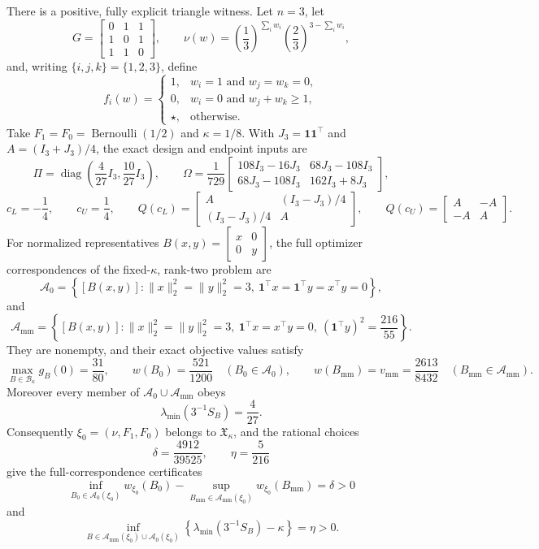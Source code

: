 There is a positive, fully explicit triangle witness.  Let \(n=3\), let
\[
G=\begin{bmatrix}0&1&1\\1&0&1\\1&1&0\end{bmatrix},
\qquad
\nu(w)=\left(\frac13\right)^{\sum_iw_i}
       \left(\frac23\right)^{3-\sum_iw_i},
\]
and, writing \(\{i,j,k\}=\{1,2,3\}\), define
\[
f_i(w)=
\begin{cases}
1,&w_i=1\text{ and }w_j=w_k=0,\\
0,&w_i=0\text{ and }w_j+w_k\ge1,\\
\star,&\text{otherwise}.
\end{cases}
\]
Take \(F_1=F_0=\operatorname{Bernoulli}(1/2)\) and \(\kappa=1/8\).  With \(J_3=\mathbf 1\mathbf 1^{\top}\) and \(A=(I_3+J_3)/4\), the exact design and endpoint inputs are
\[
\Pi=\operatorname{diag}\!\left(\frac4{27}I_3,\frac{10}{27}I_3\right),
\qquad
\Omega=\frac1{729}
\begin{bmatrix}
108I_3-16J_3&68J_3-108I_3\\
68J_3-108I_3&162I_3+8J_3
\end{bmatrix},
\]
\[
c_L=-\frac14,
\qquad c_U=\frac14,
\qquad
Q(c_L)=
\begin{bmatrix}A&(I_3-J_3)/4\\(I_3-J_3)/4&A\end{bmatrix},
\qquad
Q(c_U)=
\begin{bmatrix}A&-A\\-A&A\end{bmatrix}.
\]
For normalized representatives \(B(x,y)=\begin{bmatrix}x&0\\0&y\end{bmatrix}\), the full optimizer correspondences of the fixed-\(\kappa\), rank-two problem are
\[
\mathcal A_0=
\left\{[B(x,y)]:
\lVert x\rVert_2^2=\lVert y\rVert_2^2=3,\ 
\mathbf 1^{\top}x=\mathbf 1^{\top}y=x^{\top}y=0
\right\},
\]
and
\[
\mathcal A_{\mathrm{mm}}=
\left\{[B(x,y)]:
\lVert x\rVert_2^2=\lVert y\rVert_2^2=3,\ 
\mathbf 1^{\top}x=x^{\top}y=0,\ 
(\mathbf 1^{\top}y)^2=\frac{216}{55}
\right\}.
\]
They are nonempty, and their exact objective values satisfy
\[
\max_{B\in\mathcal B_\kappa}g_B(0)=\frac{31}{80},
\qquad
w(B_0)=\frac{521}{1200}\quad(B_0\in\mathcal A_0),
\qquad
w(B_{\mathrm{mm}})=v_{\mathrm{mm}}=\frac{2613}{8432}
\quad(B_{\mathrm{mm}}\in\mathcal A_{\mathrm{mm}}).
\]
Moreover every member of \(\mathcal A_0\cup\mathcal A_{\mathrm{mm}}\) obeys
\[
\lambda_{\min}(3^{-1}S_B)=\frac4{27}.
\]
Consequently \(\xi_0=(\nu,F_1,F_0)\) belongs to \(\mathfrak X_\kappa\), and the rational choices
\[
\delta=\frac{4912}{39525},
\qquad
\eta=\frac5{216}
\]
give the full-correspondence certificates
\[
\inf_{B_0\in\mathcal A_0(\xi_0)}w_{\xi_0}(B_0)
-\sup_{B_{\mathrm{mm}}\in\mathcal A_{\mathrm{mm}}(\xi_0)}w_{\xi_0}(B_{\mathrm{mm}})
=\delta>0
\]
and
\[
\inf_{B\in\mathcal A_{\mathrm{mm}}(\xi_0)\cup\mathcal A_0(\xi_0)}
\left\{\lambda_{\min}(3^{-1}S_B)-\kappa\right\}
=\eta>0.
\]